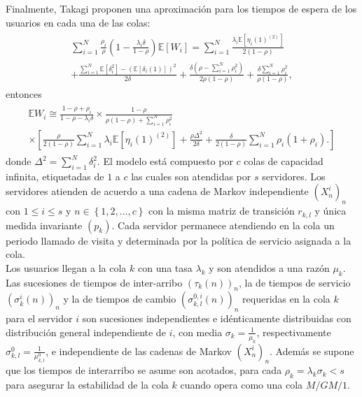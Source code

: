 \documentclass{article}
\newcommand{\esp}{\mathbb{E}}
\numberwithin{equation}{section}
\begin{document}
Finalmente, Takagi \cite{Takagi} proponen una aproximaci\'on para los tiempos de espera de los usuarios en cada una de las colas:
\begin{eqnarray}
\begin{array}{l}
\sum_{i=1}^{N}\frac{\rho_{i}}{\rho}\left(1-\frac{\lambda_{i}\delta}{1-\rho}\right)\esp\left[W_{i}\right]=\sum_{i=1}^{N}\frac{\lambda_{i}\esp\left[\eta_{i}\left(1\right)^{(2)}\right]}{2\left(1-\rho\right)}\\
+\frac{\sum_{i=1}^{N}\esp\left[\delta_{i}^{2}\right]-\left(\esp\left[\delta_{i}\left(1\right)\right]\right)^{2}}{2\delta}+\frac{\delta\left(\rho-\sum_{i=1}^{N}\rho_{i}^{2}\right)}{2\rho\left(1-\rho\right)}+\frac{\delta\sum_{i=1}^{N}\rho_{i}^{2}}{\rho\left(1-\rho\right)},
\end{array}
\end{eqnarray}
entonces
\begin{eqnarray}\label{LPCPKL}
\begin{array}{l}
\esp
W_{i}\cong\frac{1-\rho+\rho_{i}}{1-\rho-\lambda_{i}\delta}\times\frac{1-\rho}{\rho\left(1-\rho\right)+\sum_{i=1}^{N}\rho_{i}^{2}}\\
\times\left[\frac{\rho}{2\left(1-\rho\right)}\sum_{i=1}^{N}\lambda_{i}\esp\left[\eta_{i}\left(1\right)^{(2)}\right]+\frac{\rho\Delta^{2}}{2\delta}+\frac{\delta}{2\left(1-\rho\right)}\sum_{i=1}^{N}\rho_{i}\left(1+\rho_{i}\right).\right]
\end{array}
\end{eqnarray}
donde $\Delta^{2}=\sum_{i=1}^{N}\delta_{i}^{2}$. El modelo est\'a compuesto por $c$ colas de capacidad infinita, etiquetadas de $1$ a $c$ las cuales son atendidas por $s$ servidores. Los servidores atienden de acuerdo a una cadena de Markov independiente $\left(X^{i}_{n}\right)_{n}$ con $1\leq i\leq s$ y $n\in\left\{1,2,\ldots,c\right\}$ con la misma matriz de transici\'on $r_{k,l}$ y \'unica medida invariante $\left(p_{k}\right)$. Cada servidor permanece atendiendo en la cola un periodo llamado de visita y determinada por la pol\'itica de servicio asignada a la cola.\\

Los usuarios llegan a la cola $k$ con una tasa $\lambda_{k}$ y son atendidos a una raz\'on $\mu_{k}$. Las sucesiones de tiempos de inter-arribo $\left(\tau_{k}\left(n\right)\right)_{n}$, la de tiempos de servicio $\left(\sigma_{k}^{i}\left(n\right)\right)_{n}$ y la de tiempos de cambio $\left(\sigma_{k,l}^{0,i}\left(n\right)\right)_{n}$ requeridas en la cola $k$ para el servidor $i$ son sucesiones independientes e id\'enticamente distribuidas con distribuci\'on general independiente de $i$, con media $\sigma_{k}=\frac{1}{\mu_{k}}$, respectivamente $\sigma_{k,l}^{0}=\frac{1}{\mu_{k,l}^{0}}$, e independiente de las cadenas de Markov $\left(X^{i}_{n}\right)_{n}$. Adem\'as se supone que los tiempos de interarribo se asume son acotados, para cada $\rho_{k}=\lambda_{k}\sigma_{k}<s$ para asegurar la estabilidad de la cola $k$ cuando opera como una cola $M/GM/1$.\\
\end{document}
